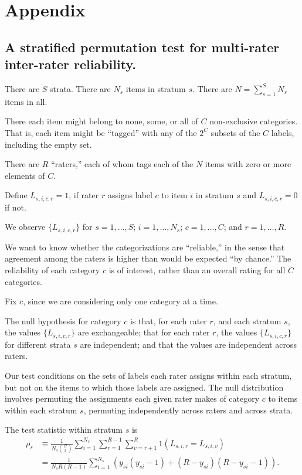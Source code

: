 \documentclass[]{article}
\begin{document}
\pagebreak

\section*{Appendix}

\subsection*{A stratified permutation test for multi-rater inter-rater reliability.}

There are $S$ strata.
There are $N_s$ items in stratum $s$.
There are $N = \sum_{s=1}^S N_s$ items in all.

There each item might belong to none, some, or all of $C$ non-exclusive categories.
That is, each item might be ``tagged'' with any of the $2^C$ subsets
of the $C$ labels, including the empty set.

There are $R$ ``raters,'' each of whom tags each of the $N$ items with zero
or more elements of $C$.

Define $L_{s,i,c,r} = 1$, if rater $r$ assigns label $c$ to item $i$ in stratum
$s$ and $L_{s,i,c,r} = 0$ if not.

We observe $\{ L_{s,i,c,r} \}$ for $s=1, \dots, S$;  $i=1, \dots, N_s$;
$c=1, \dots, C$; and $r=1, \dots, R$.

We want to know whether the categorizations are ``reliable,'' in the sense that
agreement among the raters is higher than would be expected ``by chance.''
The reliability of each category $c$ is of interest, rather than an overall
rating for all $C$ categories.

Fix $c$, since we are considering only one category at a time.

The null hypothesis for category $c$ is that, for each rater $r$, and each
stratum $s$, the values $\{ L_{s,i,c,r} \}$ are exchangeable; that for each
rater $r$, the values $\{ L_{s,i,c,r} \}$ for different strata $s$ are
independent; and that the values are independent across raters.

Our test conditions on the sets of labels each rater assigns within each
stratum, but not on the items to which those labels are assigned.
The null distribution involves permuting the assignments each given rater makes
of category $c$ to items within each stratum $s$, permuting independently
across raters and across strata.

The test statistic within stratum $s$ is
\begin{align*}
\rho_s &\equiv \frac{1}{N_s {R \choose 2}} \sum_{i=1}^{N_s}
              \sum_{r=1}^{R-1} \sum_{v=r+1}^R 1(L_{s,i,r} = L_{s,i,v}) \\
              &= \frac{1}{N_s R(R-1)} \sum_{i=1}^{N_s}
                (y_{si}(y_{si}-1) + (R-y_{si})(R-y_{si}-1)).
\end{align*}
\end{document}
